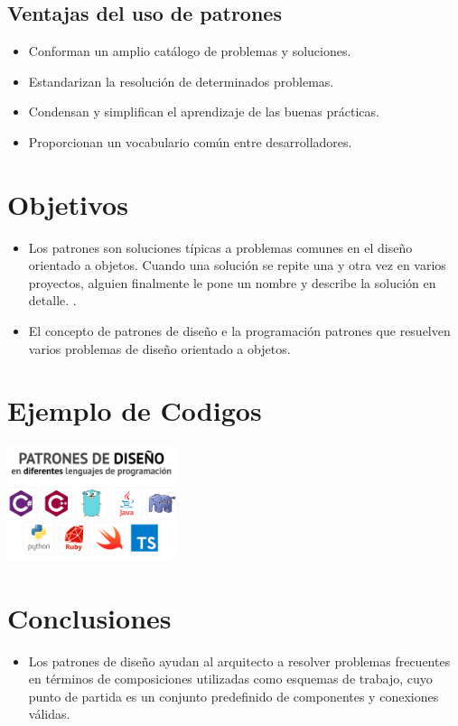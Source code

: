 \documentclass[twoside,twocolumn]{article}
\begin{document}
\subsection{Ventajas del uso de patrones}

\begin{itemize}
	\item Conforman un amplio catálogo de problemas y soluciones.
	\item Estandarizan la resolución de determinados problemas.
	\item Condensan y simplifican el aprendizaje de las buenas prácticas.
	\item Proporcionan un vocabulario común entre desarrolladores.
	
\end{itemize}

\section{Objetivos}

\begin{itemize}
\item  Los patrones son soluciones típicas a problemas comunes en el diseño orientado a objetos. Cuando una solución se repite una y otra vez en varios proyectos, alguien finalmente le pone un nombre y describe la solución en detalle. .
\item El concepto de patrones de diseño e la programación
patrones que resuelven varios problemas de diseño orientado a objetos.
\end{itemize}
\section{Ejemplo de Codigos}
\begin{center}
	\includegraphics[width=5cm]{./Imagenes/1} 
\end{center}



\section{Conclusiones}\label{sec:6}
\begin{itemize}
	\item Los patrones de diseño ayudan al arquitecto a resolver problemas frecuentes en términos de composiciones utilizadas como esquemas de trabajo, cuyo punto de partida es un conjunto predefinido de componentes y conexiones válidas.
\end{itemize}
\end{document}
